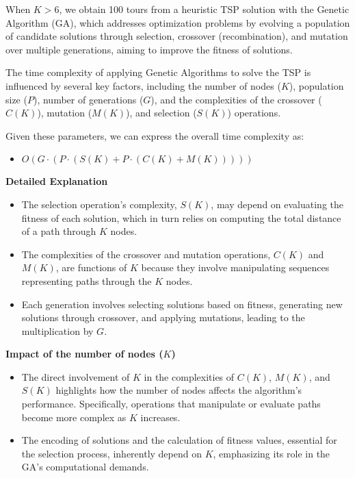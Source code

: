 \documentclass[preprint,authoryear]{elsarticle}
\begin{document}
{When $K > 6$, we obtain 100 tours from a heuristic TSP solution with the Genetic Algorithm (GA), which addresses optimization problems by evolving a population of candidate solutions through selection, crossover (recombination), and mutation over multiple generations, aiming to improve the fitness of solutions.

The time complexity of applying Genetic Algorithms to solve the TSP is influenced by several key factors, including the number of nodes (\(K\)), population size (\(P\)), number of generations (\(G\)), and the complexities of the crossover (\(C(K)\)), mutation (\(M(K)\)), and selection (\(S(K)\)) operations.

Given these parameters, we can express the overall time complexity as:
\begin{itemize}
	\item $O(G \cdot (P \cdot (S(K) + P \cdot (C(K) + M(K)))))$
\end{itemize}

{\bf Detailed Explanation}
\begin{itemize}
	\item The selection operation's complexity, \(S(K)\), may depend on evaluating the fitness of each solution, which in turn relies on computing the total distance of a path through \(K\) nodes.
	\item The complexities of the crossover and mutation operations, \(C(K)\) and \(M(K)\), are functions of \(K\) because they involve manipulating sequences representing paths through the \(K\) nodes.
	\item Each generation involves selecting solutions based on fitness, generating new solutions through crossover, and applying mutations, leading to the multiplication by \(G\).
\end{itemize}

{\bf Impact of the number of nodes (\(K\))}
\begin{itemize}
	\item The direct involvement of \(K\) in the complexities of \(C(K)\), \(M(K)\), and \(S(K)\) highlights how the number of nodes affects the algorithm's performance. Specifically, operations that manipulate or evaluate paths become more complex as \(K\) increases.
	\item The encoding of solutions and the calculation of fitness values, essential for the selection process, inherently depend on \(K\), emphasizing its role in the GA's computational demands.
\end{itemize}

}
\end{document}

